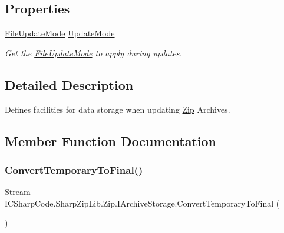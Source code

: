 \subsection*{Properties}
\begin{DoxyCompactItemize}
\item 
\hyperlink{namespace_i_c_sharp_code_1_1_sharp_zip_lib_1_1_zip_a626313bc452203ca2bdb092947541027}{File\+Update\+Mode} \hyperlink{interface_i_c_sharp_code_1_1_sharp_zip_lib_1_1_zip_1_1_i_archive_storage_ab33a000171ef06349c3d739bb63e1fe2}{Update\+Mode}
\begin{DoxyCompactList}\small\item\em Get the \hyperlink{namespace_i_c_sharp_code_1_1_sharp_zip_lib_1_1_zip_a626313bc452203ca2bdb092947541027}{File\+Update\+Mode} to apply during updates. \end{DoxyCompactList}\end{DoxyCompactItemize}


\subsection{Detailed Description}
Defines facilities for data storage when updating \hyperlink{namespace_i_c_sharp_code_1_1_sharp_zip_lib_1_1_zip}{Zip} Archives. 



\subsection{Member Function Documentation}
\mbox{\label{interface_i_c_sharp_code_1_1_sharp_zip_lib_1_1_zip_1_1_i_archive_storage_aa254436478256b7d33cf2739002346f5}} 
\subsubsection{\texorpdfstring{Convert\+Temporary\+To\+Final()}{ConvertTemporaryToFinal()}}
{\footnotesize\ttfamily Stream I\+C\+Sharp\+Code.\+Sharp\+Zip\+Lib.\+Zip.\+I\+Archive\+Storage.\+Convert\+Temporary\+To\+Final (\begin{DoxyParamCaption}{ }\end{DoxyParamCaption})}



